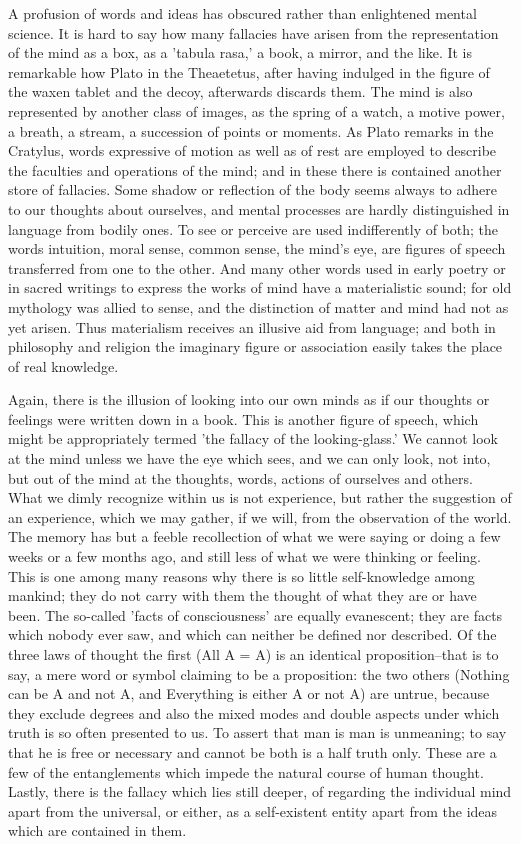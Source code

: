A profusion of words and ideas has obscured rather than enlightened
mental science. It is hard to say how many fallacies have arisen from
the representation of the mind as a box, as a 'tabula rasa,' a book,
a mirror, and the like. It is remarkable how Plato in the Theaetetus,
after having indulged in the figure of the waxen tablet and the decoy,
afterwards discards them. The mind is also represented by another class
of images, as the spring of a watch, a motive power, a breath, a stream,
a succession of points or moments. As Plato remarks in the Cratylus,
words expressive of motion as well as of rest are employed to describe
the faculties and operations of the mind; and in these there is
contained another store of fallacies. Some shadow or reflection of the
body seems always to adhere to our thoughts about ourselves, and mental
processes are hardly distinguished in language from bodily ones. To see
or perceive are used indifferently of both; the words intuition, moral
sense, common sense, the mind's eye, are figures of speech transferred
from one to the other. And many other words used in early poetry or in
sacred writings to express the works of mind have a materialistic sound;
for old mythology was allied to sense, and the distinction of matter and
mind had not as yet arisen. Thus materialism receives an illusive aid
from language; and both in philosophy and religion the imaginary figure
or association easily takes the place of real knowledge.

Again, there is the illusion of looking into our own minds as if our
thoughts or feelings were written down in a book. This is another figure
of speech, which might be appropriately termed 'the fallacy of the
looking-glass.' We cannot look at the mind unless we have the eye
which sees, and we can only look, not into, but out of the mind at
the thoughts, words, actions of ourselves and others. What we dimly
recognize within us is not experience, but rather the suggestion of an
experience, which we may gather, if we will, from the observation of the
world. The memory has but a feeble recollection of what we were saying
or doing a few weeks or a few months ago, and still less of what we
were thinking or feeling. This is one among many reasons why there is
so little self-knowledge among mankind; they do not carry with them
the thought of what they are or have been. The so-called 'facts of
consciousness' are equally evanescent; they are facts which nobody ever
saw, and which can neither be defined nor described. Of the three laws
of thought the first (All A = A) is an identical proposition--that is to
say, a mere word or symbol claiming to be a proposition: the two others
(Nothing can be A and not A, and Everything is either A or not A) are
untrue, because they exclude degrees and also the mixed modes and double
aspects under which truth is so often presented to us. To assert that
man is man is unmeaning; to say that he is free or necessary and cannot
be both is a half truth only. These are a few of the entanglements which
impede the natural course of human thought. Lastly, there is the fallacy
which lies still deeper, of regarding the individual mind apart from
the universal, or either, as a self-existent entity apart from the ideas
which are contained in them.

